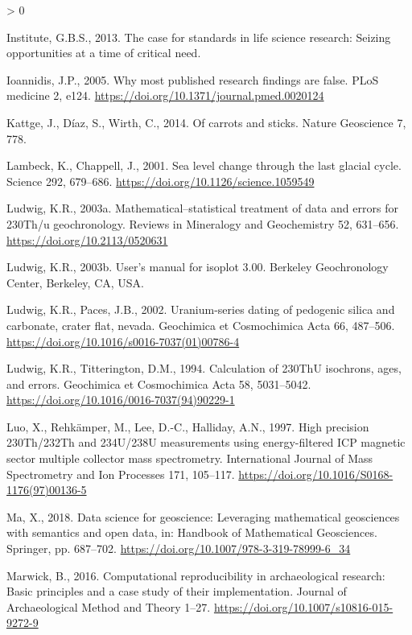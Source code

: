 \documentclass[]{elsarticle} %
\newlength{\cslhangindent}
\newenvironment{CSLReferences}[2] %
 {%
  \setlength{\parindent}{0pt}
  \ifodd #1 \everypar{\setlength{\hangindent}{\cslhangindent}}\ignorespaces\fi
  \ifnum #2 > 0
  \setlength{\parskip}{#2\baselineskip}
  \fi
 }%
 {}
\begin{document}
\begin{CSLReferences}{1}{0}
\leavevmode\hypertarget{ref-global2013case}{}%
Institute, G.B.S., 2013. The case for standards in life science research: Seizing opportunities at a time of critical need.

\leavevmode\hypertarget{ref-ioannidis2005most}{}%
Ioannidis, J.P., 2005. Why most published research findings are false. PLoS medicine 2, e124. \url{https://doi.org/10.1371/journal.pmed.0020124}

\leavevmode\hypertarget{ref-Kattge_Diaz_Wirth_2014}{}%
Kattge, J., Díaz, S., Wirth, C., 2014. Of carrots and sticks. Nature Geoscience 7, 778.

\leavevmode\hypertarget{ref-RN510}{}%
Lambeck, K., Chappell, J., 2001. Sea level change through the last glacial cycle. Science 292, 679--686. \url{https://doi.org/10.1126/science.1059549}

\leavevmode\hypertarget{ref-RN4370}{}%
Ludwig, K.R., 2003a. Mathematical--statistical treatment of data and errors for 230Th/u geochronology. Reviews in Mineralogy and Geochemistry 52, 631--656. \url{https://doi.org/10.2113/0520631}

\leavevmode\hypertarget{ref-RN2163}{}%
Ludwig, K.R., 2003b. User's manual for isoplot 3.00. Berkeley Geochronology Center, Berkeley, CA, USA.

\leavevmode\hypertarget{ref-RN801}{}%
Ludwig, K.R., Paces, J.B., 2002. Uranium-series dating of pedogenic silica and carbonate, crater flat, nevada. Geochimica et Cosmochimica Acta 66, 487--506. \url{https://doi.org/10.1016/s0016-7037(01)00786-4}

\leavevmode\hypertarget{ref-RN2155}{}%
Ludwig, K.R., Titterington, D.M., 1994. Calculation of 230ThU isochrons, ages, and errors. Geochimica et Cosmochimica Acta 58, 5031--5042. \url{https://doi.org/10.1016/0016-7037(94)90229-1}

\leavevmode\hypertarget{ref-RN2951}{}%
Luo, X., Rehkämper, M., Lee, D.-C., Halliday, A.N., 1997. High precision 230Th/232Th and 234U/238U measurements using energy-filtered ICP magnetic sector multiple collector mass spectrometry. International Journal of Mass Spectrometry and Ion Processes 171, 105--117. \url{https://doi.org/10.1016/S0168-1176(97)00136-5}

\leavevmode\hypertarget{ref-ma2018data}{}%
Ma, X., 2018. Data science for geoscience: Leveraging mathematical geosciences with semantics and open data, in: Handbook of Mathematical Geosciences. Springer, pp. 687--702. \url{https://doi.org/10.1007/978-3-319-78999-6_34}

\leavevmode\hypertarget{ref-Marwick2016repro}{}%
Marwick, B., 2016. Computational reproducibility in archaeological research: Basic principles and a case study of their implementation. Journal of Archaeological Method and Theory 1--27. \url{https://doi.org/10.1007/s10816-015-9272-9}


\end{CSLReferences}
\end{document}
